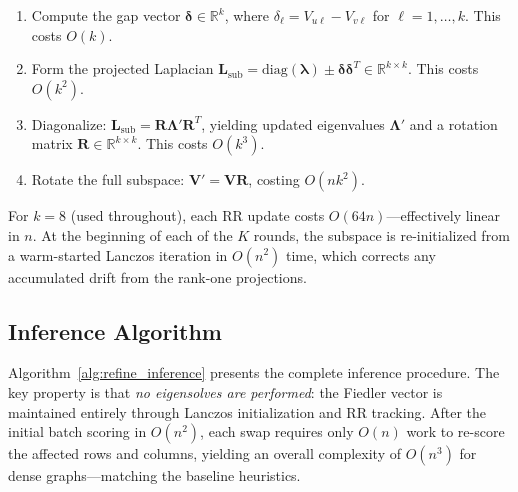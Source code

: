 \documentclass{article}
\begin{document}
\begin{enumerate}
    \item Compute the gap vector $\boldsymbol{\delta} \in \mathbb{R}^k$, where $\delta_\ell = V_{u\ell} - V_{v\ell}$ for $\ell = 1, \ldots, k$. This costs $O(k)$.
    \item Form the projected Laplacian $\mathbf{L}_{\text{sub}} = \text{diag}(\boldsymbol{\lambda}) \pm \boldsymbol{\delta}\boldsymbol{\delta}^T \in \mathbb{R}^{k \times k}$. This costs $O(k^2)$.
    \item Diagonalize: $\mathbf{L}_{\text{sub}} = \mathbf{R} \boldsymbol{\Lambda}' \mathbf{R}^T$, yielding updated eigenvalues $\boldsymbol{\Lambda}'$ and a rotation matrix $\mathbf{R} \in \mathbb{R}^{k \times k}$. This costs $O(k^3)$.
    \item Rotate the full subspace: $\mathbf{V}' = \mathbf{V} \mathbf{R}$, costing $O(nk^2)$.
\end{enumerate}
For $k = 8$ (used throughout), each RR update costs $O(64n)$—effectively linear in $n$. At the beginning of each of the $K$ rounds, the subspace is re-initialized from a warm-started Lanczos iteration in $O(n^2)$ time, which corrects any accumulated drift from the rank-one projections.

\subsection{Inference Algorithm}

Algorithm~\ref{alg:refine_inference} presents the complete inference procedure. The key property is that \emph{no eigensolves are performed}: the Fiedler vector is maintained entirely through Lanczos initialization and RR tracking. After the initial batch scoring in $O(n^2)$, each swap requires only $O(n)$ work to re-score the affected rows and columns, yielding an overall complexity of $O(n^3)$ for dense graphs—matching the baseline heuristics.
\end{document}
